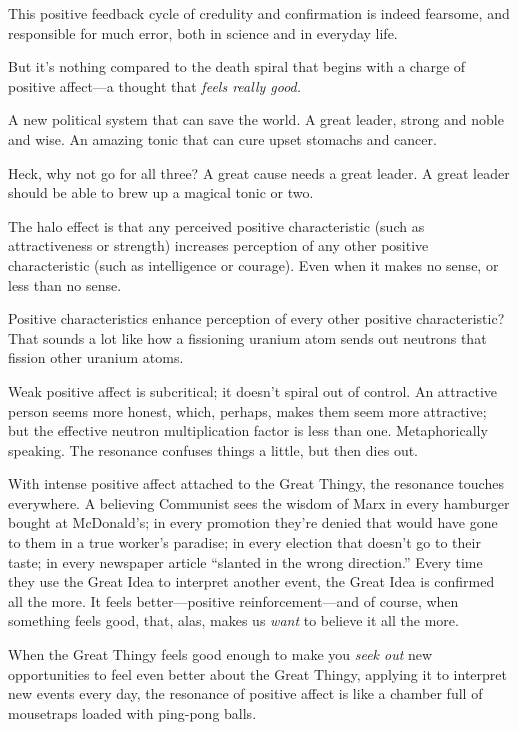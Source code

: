 {
 This positive feedback cycle of credulity and confirmation is
indeed fearsome, and responsible for much error, both in science and in
everyday life.}

{
 But it's nothing compared to the death spiral that
begins with a charge of positive affect---a thought that \textit{feels
really good.}}

{
 A new political system that can save the world. A great leader,
strong and noble and wise. An amazing tonic that can cure upset
stomachs and cancer.}

{
 Heck, why not go for all three? A great cause needs a great
leader. A great leader should be able to brew up a magical tonic or
two.}

{
 The halo effect is that any perceived positive characteristic
(such as attractiveness or strength) increases perception of any other
positive characteristic (such as intelligence or courage). Even when it
makes no sense, or less than no sense.}

{
 Positive characteristics enhance perception of every other
positive characteristic? That sounds a lot like how a fissioning
uranium atom sends out neutrons that fission other uranium atoms.}

{
 Weak positive affect is subcritical; it doesn't
spiral out of control. An attractive person seems more honest, which,
perhaps, makes them seem more attractive; but the effective neutron
multiplication factor is less than one. Metaphorically speaking. The
resonance confuses things a little, but then dies out.}

{
 With intense positive affect attached to the Great Thingy, the
resonance touches everywhere. A believing Communist sees the wisdom of
Marx in every hamburger bought at McDonald's; in every
promotion they're denied that would have gone to them
in a true worker's paradise; in every election that
doesn't go to their taste; in every newspaper article
``slanted in the wrong direction.''
Every time they use the Great Idea to interpret another event, the
Great Idea is confirmed all the more. It feels better---positive
reinforcement---and of course, when something feels good, that, alas,
makes us \textit{want} to believe it all the more.}

{
 When the Great Thingy feels good enough to make you \textit{seek
out} new opportunities to feel even better about the Great Thingy,
applying it to interpret new events every day, the resonance of
positive affect is like a chamber full of mousetraps loaded with
ping-pong balls.}

